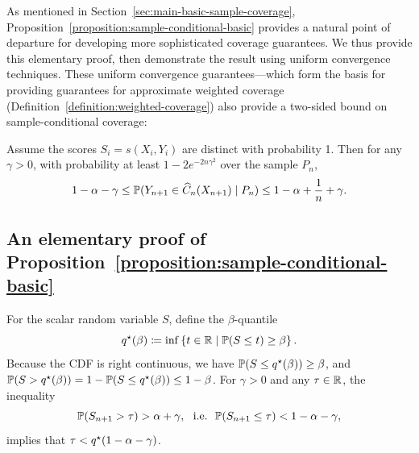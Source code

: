 \documentclass{article}
\newcommand{\scorefunc}{s}
\newcommand{\scoreval}{\scorefunc}
\newcommand{\scorerv}{S}
\begin{document}
As mentioned in Section~\ref{sec:main-basic-sample-coverage},
Proposition~\ref{proposition:sample-conditional-basic} provides a natural point of
departure for developing more sophisticated coverage guarantees.
%
We thus provide this elementary proof, then
demonstrate the result using uniform convergence techniques.
%
These uniform convergence guarantees---which form the basis
for providing guarantees for approximate weighted coverage
(Definition~\ref{definition:weighted-coverage}) also
provide a two-sided bound on sample-conditional coverage:
\begin{corollary}
  \label{corollary:distinct-scores}
  Assume the scores $\scorerv_i = \scoreval(X_i, Y_i)$ are distinct with
  probability 1.
  Then for any $\gamma > 0$, with probability at least
  $1 - 2 e^{-2n \gamma^2}$ over the sample $P_n$,
  \begin{equation*}
    1 - \alpha - \gamma
    \le \mathbb{P}(Y_{n + 1} \in \widehat{C}_n(X_{n + 1}) \mid P_n)
    \le 1 - \alpha + \frac{1}{n} + \gamma.
  \end{equation*}
\end{corollary}



\subsection{An elementary proof of
  Proposition~\ref{proposition:sample-conditional-basic}}

For the scalar random variable $\scorerv$, define the $\beta$-quantile
\begin{equation}
  \label{eqn:actual-quantile-mapping}
  q\opt(\beta) \defeq \inf \left\{t \in \R
  \mid \P(\scorerv \le t) \ge \beta \right\}.
\end{equation}
Because the CDF is right continuous, we have $\mathbb{P}(S \le q^\star(\beta)) \ge
\beta$, and $\mathbb{P}(S > q^\star(\beta)) = 1 - \mathbb{P}(S \le q^\star(\beta)) \le 1 -
\beta$.
%
For $\gamma > 0$ and any $\tau \in \mathbb{R}$, the inequality
\begin{equation*}
  \P(\scorerv_{n + 1} > \tau) > \alpha + \gamma,
  ~~ \mbox{i.e.} ~~
  \P(\scorerv_{n + 1} \le \tau) < 1 - \alpha - \gamma,
\end{equation*}
implies that $\tau < q^\star(1 - \alpha - \gamma)$.
\end{document}
